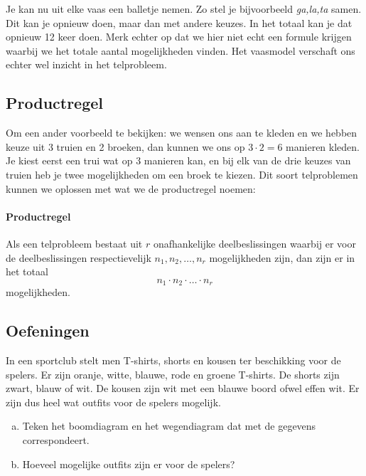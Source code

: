 \documentclass[12pt,a4paper,twoside]{article}
\begin{document}
Je kan nu uit elke vaas een balletje nemen. Zo stel je bijvoorbeeld {\em ga,la,ta} samen. Dit kan je opnieuw doen, maar dan met andere keuzes. In het totaal kan je dat opnieuw 12 keer doen. Merk echter op dat we hier niet echt een formule krijgen waarbij we het totale aantal mogelijkheden vinden. Het vaasmodel verschaft ons echter wel inzicht in het telprobleem.

\subsection{Productregel}

Om een ander voorbeeld te bekijken: we wensen ons aan te kleden en we hebben keuze uit 3 truien en 2 broeken, dan kunnen we ons op $3 \cdot 2 = 6$ manieren kleden. Je kiest eerst een trui wat op 3 manieren kan, en bij elk van de drie keuzes van truien heb je twee mogelijkheden om een broek te kiezen. Dit soort telproblemen kunnen we oplossen met wat we de productregel noemen:

\paragraph*{Productregel}
\begin{mdframed}
Als een telprobleem bestaat uit $r$ onafhankelijke deelbeslissingen waarbij er voor de deelbeslissingen respectievelijk $n_1, n_2, \ldots , n_r$ mogelijkheden zijn, dan zijn er in het totaal
\[n_1 \cdot n_2 \cdot \ldots \cdot n_r\]
mogelijkheden.
\end{mdframed}

\needspace{4cm}
\subsection{Oefeningen}

\begin{oefening}
In een sportclub stelt men T-shirts, shorts en kousen ter beschikking voor de spelers. Er zijn oranje, witte, blauwe, rode en groene T-shirts. De shorts zijn zwart, blauw of wit. De kousen zijn wit met een blauwe boord ofwel effen wit. Er zijn dus heel wat outfits voor de spelers mogelijk.

\begin{enumerate}[(a)]
\item Teken het boomdiagram en het wegendiagram dat met de gegevens correspondeert.
\item Hoeveel mogelijke outfits zijn er voor de spelers?
\end{enumerate}
\end{oefening}
\end{document}
